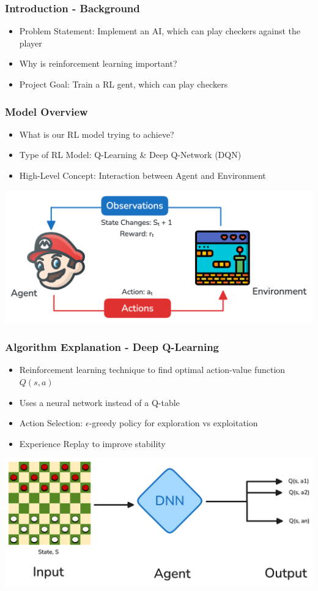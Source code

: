 \begin{frame}
    \frametitle{Introduction - Background}
    \begin{itemize}
        \item Problem Statement: Implement an AI, which can play checkers against the player
        \item Why is reinforcement learning important?
        \item Project Goal: Train a RL gent, which can play checkers
    \end{itemize}
\end{frame}

\begin{frame}
    \frametitle{Model Overview}
    \begin{itemize}
        \item What is our RL model trying to achieve?
        \item Type of RL Model: Q-Learning \& Deep Q-Network (DQN)
        \item High-Level Concept: Interaction between Agent and Environment
    \end{itemize}
    \centering
    \includegraphics[scale=0.25]{rl_agent_env}
\end{frame}

\begin{frame}
    \frametitle{Algorithm Explanation - Deep Q-Learning}
    \begin{itemize}
        \item Reinforcement learning technique to find optimal action-value function \( Q(s,a) \)
        \item Uses a neural network instead of a Q-table
        \item Action Selection: $\epsilon$-greedy policy for exploration vs exploitation
        \item Experience Replay to improve stability
    \end{itemize}
    \centering
    \includegraphics[scale=0.17]{dqn_checkers}
\end{frame}

